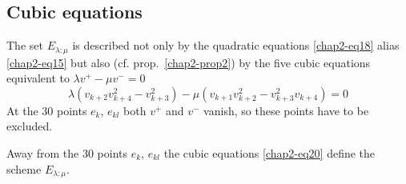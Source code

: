 \subsection{Cubic equations}\label{chap2-sec3.5}

The set $E_{\lambda:\mu}$ is described not only by the quadratic
equations \eqref{chap2-eq18} alias \eqref{chap2-eq15} but also
(cf. prop.~\ref{chap2-prop2}) by the five cubic equations equivalent
to $\lambda v^{+}-\mu v^{-}=0$
\setcounter{equation}{19}
\begin{equation}
\lambda
(v_{k+2}v^{2}_{k+4}-v^{2}_{k+3})-\mu(v_{k+1}v^{2}_{k+2}-v^{2}_{k+3}v_{k+4})=0\label{chap2-eq20} 
\end{equation}
At the 30 points $e_{k}$, $e_{kl}$ both $v^{+}$ and $v^{-}$ vanish, so
these points have to be excluded.

\begin{proposition}\label{chap2-prop7}
Away from the 30 points $e_{k}$, $e_{kl}$ the cubic
equations \eqref{chap2-eq20} define the scheme $E_{\lambda:\mu}$. 
\end{proposition}

